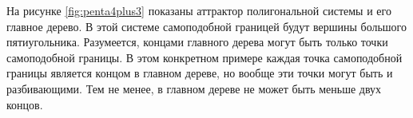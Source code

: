 На рисунке \ref{fig:penta4plus3} показаны аттрактор полигональной системы и его главное дерево. 
В этой системе самоподобной границей будут вершины большого пятиугольника.
Разумеется, концами главного дерева могут быть только точки самоподобной границы.
В этом конкретном примере каждая точка самоподобной границы является концом в главном дереве, но вообще эти точки могут быть и разбивающими.
Тем не менее, в главном дереве не может быть меньше двух концов.


